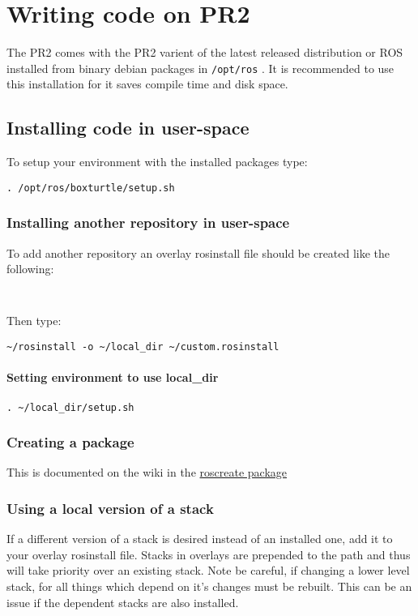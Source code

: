 \chapter{Writing code on PR2}
The PR2 comes with the PR2 varient of the latest released distribution
or ROS installed from binary debian packages in \texttt{/opt/ros} .  It is
recommended to use this installation for it saves compile time and
disk space.
\section{Installing code in user-space}
To setup your environment with the installed packages type:
\begin{verbatim}
. /opt/ros/boxturtle/setup.sh
\end{verbatim}
\subsection{Installing another repository in user-space}
To add another repository an overlay rosinstall file should be created
like the following:
\begin{verbatim}


\end{verbatim}

Then type:
\begin{verbatim}
~/rosinstall -o ~/local_dir ~/custom.rosinstall
\end{verbatim}
\subsubsection{Setting environment to use local\_dir}
\begin{verbatim}
. ~/local_dir/setup.sh
\end{verbatim}

\subsection{Creating a package}
This is documented on the wiki in the
\href{http://www.ros.org/wiki/roscreate}{roscreate package}

\subsection{Using a local version of a stack}
If a different version of a stack is desired instead of an installed
one, add it to your overlay rosinstall file.  Stacks in overlays are
prepended to the path and thus will take priority over an existing
stack.  Note be careful, if changing a lower level stack, for all
things which depend on it's changes must be rebuilt. This can be an
issue if the dependent stacks are also installed.

